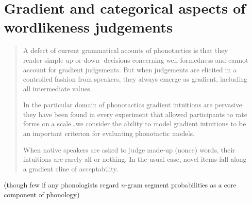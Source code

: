 \chapter{Gradient and categorical aspects of wordlikeness judgements}
\label{gradience}


\begin{quote}
A defect of current grammatical acounts of phonotactics is that they render simple up-or-down- decisions concerning well-formedness and cannot account for gradient judgements. But when judgements are elicited in a controlled fashion from speakers, they always emerge as gradient, including all intermediate values. \citep[][371]{Shademan2006}

In the particular domain of phonotactics gradient intuitions are pervasive: they have been found in every experiment that allowed participants to rate forms on a scale\ldots{}we consider the ability to model gradient intuitions to be an important criterion for evaluating phonotactic models. \citep[][382]{Hayes2008a}


When native speakers are asked to judge made-up (nonce) words, their intuitions are rarely all-or-nothing. In the usual case, novel items fall along a gradient cline of acceptability. \citep[][9]{Albright2009a}
\end{quote}

(though few if any phonologists regard $n$-gram segment probabilities as a core component of phonology)





